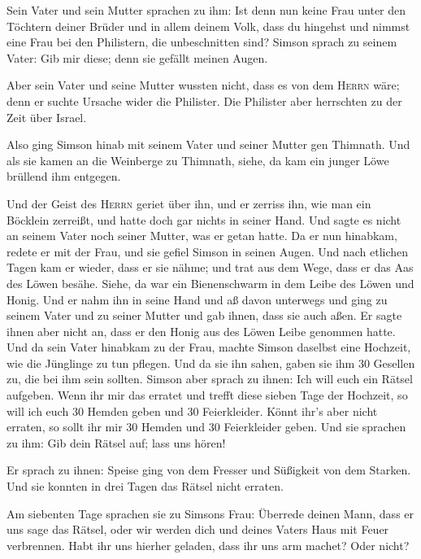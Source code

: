  Sein Vater und sein Mutter sprachen zu ihm: Ist denn nun
keine Frau unter den Töchtern deiner Brüder und in allem deinem Volk,
dass du hingehst und nimmst eine Frau bei den Philistern, die
unbeschnitten sind? Simson sprach zu seinem Vater: Gib mir diese; denn
sie gefällt meinen Augen.

 Aber sein Vater und seine Mutter wussten nicht, dass es
von dem \textsc{Herrn} wäre; denn er suchte Ursache wider die Philister.
Die Philister aber herrschten zu der Zeit über Israel.

 Also ging Simson hinab mit seinem Vater und seiner Mutter
gen Thimnath. Und als sie kamen an die Weinberge zu Thimnath, siehe, da
kam ein junger Löwe brüllend ihm entgegen.

 Und der Geist des \textsc{Herrn} geriet über ihn, und er
zerriss ihn, wie man ein Böcklein zerreißt, und hatte doch gar nichts in
seiner Hand. Und sagte es nicht an seinem Vater noch seiner Mutter, was
er getan hatte.  Da er nun hinabkam, redete er mit der
Frau, und sie gefiel Simson in seinen Augen.  Und nach
etlichen Tagen kam er wieder, dass er sie nähme; und trat aus dem Wege,
dass er das Aas des Löwen besähe. Siehe, da war ein Bienenschwarm in dem
Leibe des Löwen und Honig.  Und er nahm ihn in seine Hand
und aß davon unterwegs und ging zu seinem Vater und zu seiner Mutter und
gab ihnen, dass sie auch aßen. Er sagte ihnen aber nicht an, dass er den
Honig aus des Löwen Leibe genommen hatte.  Und da sein
Vater hinabkam zu der Frau, machte Simson daselbst eine Hochzeit, wie
die Jünglinge zu tun pflegen.  Und da sie ihn sahen,
gaben sie ihm 30 Gesellen zu, die bei ihm sein sollten. 
Simson aber sprach zu ihnen: Ich will euch ein Rätsel aufgeben. Wenn ihr
mir das erratet und trefft diese sieben Tage der Hochzeit, so will ich
euch 30 Hemden geben und 30 Feierkleider.  Könnt ihr's
aber nicht erraten, so sollt ihr mir 30 Hemden und 30 Feierkleider
geben. Und sie sprachen zu ihm: Gib dein Rätsel auf; lass uns hören!

 Er sprach zu ihnen: Speise ging von dem Fresser und
Süßigkeit von dem Starken. Und sie konnten in drei Tagen das Rätsel
nicht erraten.

 Am siebenten Tage sprachen sie zu Simsons Frau: Überrede
deinen Mann, dass er uns sage das Rätsel, oder wir werden dich und
deines Vaters Haus mit Feuer verbrennen. Habt ihr uns hierher geladen,
dass ihr uns arm machet? Oder nicht?

